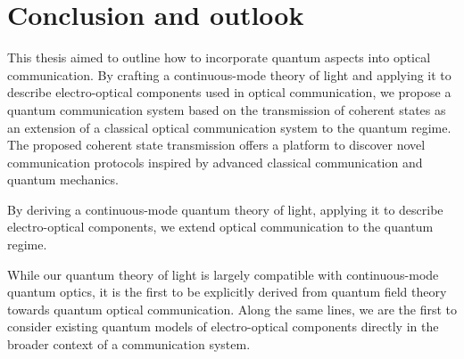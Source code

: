 \chapter*{Conclusion and outlook}

This thesis aimed to outline how to incorporate quantum aspects into optical communication.
By crafting a continuous-mode theory of light and applying it to describe electro-optical components used in optical communication, we propose a quantum communication system based on the transmission of coherent states as an extension of a classical optical communication system to the quantum regime.
The proposed coherent state transmission offers a platform to discover novel communication protocols inspired by advanced classical communication and quantum mechanics.


By deriving a continuous-mode quantum theory of light, applying it to describe electro-optical components, we extend optical communication to the quantum regime.


While our quantum theory of light is largely compatible with continuous-mode quantum optics, it is the first to be explicitly derived from quantum field theory towards quantum optical communication.
Along the same lines, we are the first to consider existing quantum models of electro-optical components directly in the broader context of a communication system.

